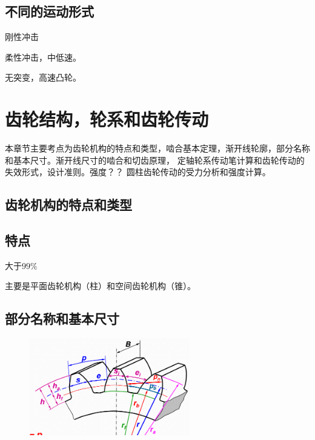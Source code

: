 \documentclass[twocolumn]{ctexart}
\begin{document}
\subsection{不同的运动形式}
\begin{description}[leftmargin=1.7cm,style=nextline,nosep]%
  \item[等速运动
  ]  刚性冲击
  \item[简谐运动] 柔性冲击，中低速。
  \item[正弦加速] 无突变，高速凸轮。 
\end{description}
\section{齿轮结构，轮系和齿轮传动}
本章节主要考点为齿轮机构的特点和类型，啮合基本定理，渐开线轮廓，部分名称和基本尺寸。渐开线尺寸的啮合和切齿原理，
定轴轮系传动笔计算和齿轮传动的失效形式，设计准则。强度？？
圆柱齿轮传动的受力分析和强度计算。
\subsection{齿轮机构的特点和类型}
\subsection{特点}
\begin{description}[leftmargin=1.7cm,style=nextline,nosep]%
    \item[传动比准确，传动平稳]
    \item[效率高] 大于$99\%$
\end{description}
主要是平面齿轮机构（柱）和空间齿轮机构（锥）。
\subsection{部分名称和基本尺寸}
        \begin{figure}[H]
            \centering
            \includegraphics[width=7cm]{img/1.png}
            \end{figure}
\end{document}
